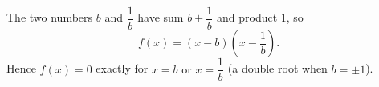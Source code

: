 The two numbers $b$ and $\dfrac1b$ have sum $b+\dfrac1b$ and product $1$, so
\[f(x)=(x-b)\left(x-\dfrac1b\right).\]
Hence $f(x)=0$ exactly for $\boxed{x=b\text{ or }x=\dfrac1b}$ (a double root when $b=\pm1$).
